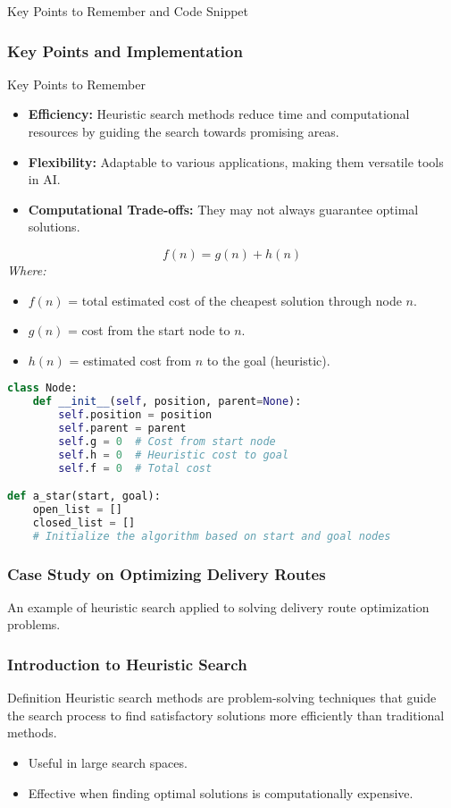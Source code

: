 \documentclass[aspectratio=169]{beamer}
\begin{document}
\begin{frame}[fragile]{Key Points to Remember and Code Snippet}
    \frametitle{Key Points and Implementation}
    \begin{block}{Key Points to Remember}
        \begin{itemize}
            \item \textbf{Efficiency:} Heuristic search methods reduce time and computational resources by guiding the search towards promising areas.
            \item \textbf{Flexibility:} Adaptable to various applications, making them versatile tools in AI.
            \item \textbf{Computational Trade-offs:} They may not always guarantee optimal solutions.
        \end{itemize}
    \end{block}

    \begin{equation}
        f(n) = g(n) + h(n)
    \end{equation}
    \textit{Where:}
    \begin{itemize}
        \item $f(n)$ = total estimated cost of the cheapest solution through node $n$.
        \item $g(n)$ = cost from the start node to $n$.
        \item $h(n)$ = estimated cost from $n$ to the goal (heuristic).
    \end{itemize}

    \begin{lstlisting}[language=Python]
class Node:
    def __init__(self, position, parent=None):
        self.position = position
        self.parent = parent
        self.g = 0  # Cost from start node
        self.h = 0  # Heuristic cost to goal
        self.f = 0  # Total cost

def a_star(start, goal):
    open_list = []
    closed_list = []
    # Initialize the algorithm based on start and goal nodes
    \end{lstlisting}
\end{frame}

\begin{frame}[fragile]
    \frametitle{Case Study on Optimizing Delivery Routes}
    An example of heuristic search applied to solving delivery route optimization problems.
\end{frame}

\begin{frame}[fragile]
    \frametitle{Introduction to Heuristic Search}
    \begin{block}{Definition}
        Heuristic search methods are problem-solving techniques that guide the search process to find satisfactory solutions more efficiently than traditional methods. 
    \end{block}
    \begin{itemize}
        \item Useful in large search spaces.
        \item Effective when finding optimal solutions is computationally expensive.
    \end{itemize}
\end{frame}
\end{document}
